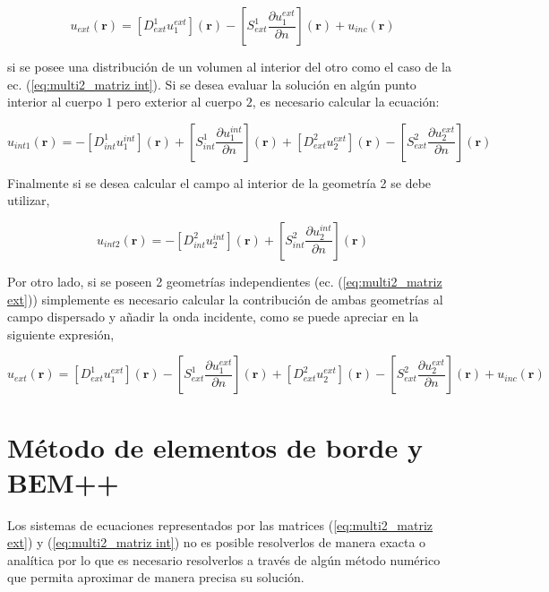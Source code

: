 \documentclass[12pt,letterpaper]{article}
\numberwithin{equation}{section}
\begin{document}
\begin{equation}
	u_{ext}(\textbf{r})=\left[D_{ext}^{1} u^{ext}_1\right](\textbf{r}) - \left[S_{ext}^1 \frac{\partial u^{ext}_1}{\partial n}\right](\textbf{r}) + u_{inc}(\textbf{r})
\end{equation}

si se posee una distribución de un volumen al interior del otro como el caso de la ec. (\ref{eq:multi2_matriz int}). Si se desea evaluar la solución en algún punto interior al cuerpo $1$ pero exterior al cuerpo $2$, es necesario calcular la ecuación:

\begin{equation}
	u_{int1}(\textbf{r})=-\left[D_{int}^{1} u^{int}_1\right](\textbf{r}) + \left[S_{int}^1 \frac{\partial u^{int}_1}{\partial n}\right](\textbf{r}) + \left[D_{ext}^{2} u^{ext}_2\right](\textbf{r}) - \left[S_{ext}^2 \frac{\partial u^{ext}_2}{\partial n}\right](\textbf{r})
\end{equation}

Finalmente si se desea calcular el campo al interior de la geometría 2 se debe utilizar,

\begin{equation}
u_{int2}(\textbf{r})=-\left[D_{int}^{2} u^{int}_2\right](\textbf{r}) + \left[S_{int}^2 \frac{\partial u^{int}_2}{\partial n}\right](\textbf{r})
\end{equation}

Por otro lado, si se poseen 2 geometrías independientes (ec. (\ref{eq:multi2_matriz ext})) simplemente es necesario calcular la contribución de ambas geometrías al campo dispersado y añadir la onda incidente, como se puede apreciar en la siguiente expresión,

\begin{equation}
u_{ext}(\textbf{r})=\left[D_{ext}^{1} u^{ext}_1\right](\textbf{r}) - \left[S_{ext}^1 \frac{\partial u^{ext}_1}{\partial n}\right](\textbf{r}) + \left[D_{ext}^{2} u^{ext}_2\right](\textbf{r}) - \left[S_{ext}^2 \frac{\partial u^{ext}_2}{\partial n}\right](\textbf{r}) + u_{inc}(\textbf{r})
\end{equation}

\pagebreak
\section{Método de elementos de borde y BEM++}
Los sistemas de ecuaciones representados por las matrices (\ref{eq:multi2_matriz ext}) y (\ref{eq:multi2_matriz int}) no es posible resolverlos de manera exacta o analítica por lo que es necesario resolverlos a través de algún método numérico que permita aproximar de manera precisa su solución.
\end{document}

